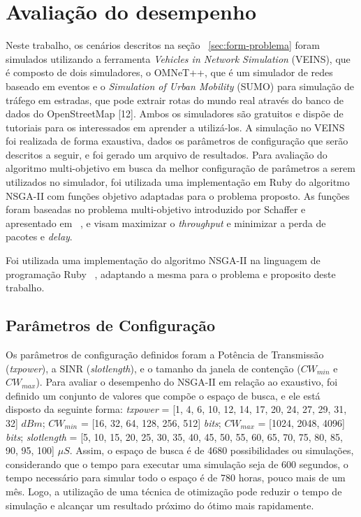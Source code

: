 \documentclass[conference]{IEEEtran}
\begin{document}
\section{Avaliação do desempenho}
\label{sec:avaliacao-desemp}

Neste trabalho, os cenários descritos na seção ~\ref{sec:form-problema} foram simulados utilizando a ferramenta \textit{Vehicles in Network Simulation} (VEINS), que é composto de dois simuladores, o OMNeT++, que é um simulador de redes baseado em eventos e o \textit{Simulation of Urban Mobility} (SUMO) para simulação de tráfego em estradas, que pode extrair rotas do mundo real através do banco de dados do OpenStreetMap [12]. Ambos os simuladores são gratuitos e dispõe de tutoriais para os interessados em aprender a utilizá-los. A simulação no VEINS foi realizada de forma exaustiva, dados os parâmetros de configuração que serão descritos a seguir, e foi gerado  um arquivo de resultados. Para avaliação do algoritmo multi-objetivo em busca da melhor configuração de parâmetros a serem utilizados no simulador, foi utilizada uma implementação em Ruby do algoritmo NSGA-II com funções objetivo adaptadas para o problema proposto. As funções foram baseadas no problema multi-objetivo introduzido por Schaffer e apresentado em ~\cite{Deb:2001}, e visam maximizar o \textit{throughput} e minimizar a perda de pacotes e \textit{delay}.

Foi utilizada uma implementação do algoritmo NSGA-II na linguagem de programação Ruby ~\cite{Brownlee:2011}, adaptando a mesma para o problema e proposito deste trabalho.

\subsection{Parâmetros de Configuração}
\label{subsec:param-config}

Os parâmetros de configuração definidos foram a Potência de Transmissão (\textit{txpower}), a SINR (\textit{slotlength}), e o tamanho da janela de contenção ($CW_{min}$ e $CW_{max}$). Para avaliar o desempenho do NSGA-II em relação ao exaustivo, foi definido um conjunto de valores que compõe o espaço de busca, e ele está disposto da seguinte forma: \textit{txpower} = [1, 4, 6, 10, 12, 14, 17, 20, 24, 27, 29, 31, 32] $dBm$; $CW_{min}$ = [16, 32, 64, 128, 256, 512] \textit{bits}; $CW_{max}$ = [1024, 2048, 4096] \textit{bits}; \textit{slotlength} =  [5, 10, 15, 20, 25, 30, 35, 40, 45, 50, 55, 60, 65, 70, 75, 80, 85, 90, 95, 100] $\mu S$. Assim, o espaço de busca é de 4680 possibilidades ou simulações, considerando que o tempo para executar uma simulação seja de 600 segundos, o tempo necessário para simular todo o espaço é de 780 horas, pouco mais de um mês. Logo, a utilização de uma técnica de otimização pode reduzir o tempo de simulação e alcançar um resultado próximo do ótimo mais rapidamente.
\end{document}
